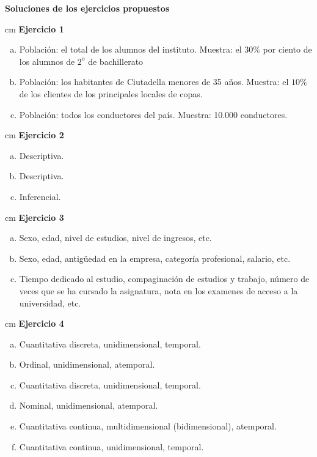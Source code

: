 \documentclass[a4paper,12pt]{report}
\begin{document}
\textbf{\Large Soluciones de los ejercicios propuestos}

 cm
\noindent
\textbf{Ejercicio 1}
\begin{enumerate}[a)]
\item Poblaci\'on: el total de los alumnos del instituto. 
Muestra: el $30\%$ por ciento de los alumnos de $2^\text{o}$ de bachillerato
\item Poblaci\'on: los habitantes de Ciutadella menores de 35 a\~nos.
Muestra: el $10\%$ de los clientes de los principales locales de copas.
\item Poblaci\'on: todos los conductores del pa\'is. Muestra: 10.000 conductores.
\end{enumerate}

 cm
\noindent
\textbf{Ejercicio 2}\begin{enumerate}[a)]
\item Descriptiva.
\item Descriptiva.
\item Inferencial.
\end{enumerate}

 cm
\noindent
\textbf{Ejercicio 3}
\begin{enumerate}[a)]
\item Sexo, edad, nivel de estudios, nivel de ingresos, etc.
\item Sexo, edad, antig\"uedad en la empresa, categor\'ia profesional, salario, etc.
\item Tiempo dedicado al estudio, compaginaci\'on de estudios
y trabajo, n\'umero de veces que se ha cursado la asignatura, 
nota en los examenes de acceso a la universidad, etc.
\end{enumerate}

 cm
\noindent
\textbf{Ejercicio 4}
\begin{enumerate}[a)]
\item Cuantitativa discreta, unidimensional, temporal.
\item Ordinal, unidimensional, atemporal.
\item Cuantitativa discreta, unidimensional, temporal.
\item Nominal, unidimensional, atemporal.
\item Cuantitativa continua, multidimensional (bidimensional), atemporal.
\item Cuantitativa continua, unidimensional, temporal.
\end{enumerate}
\end{document}
